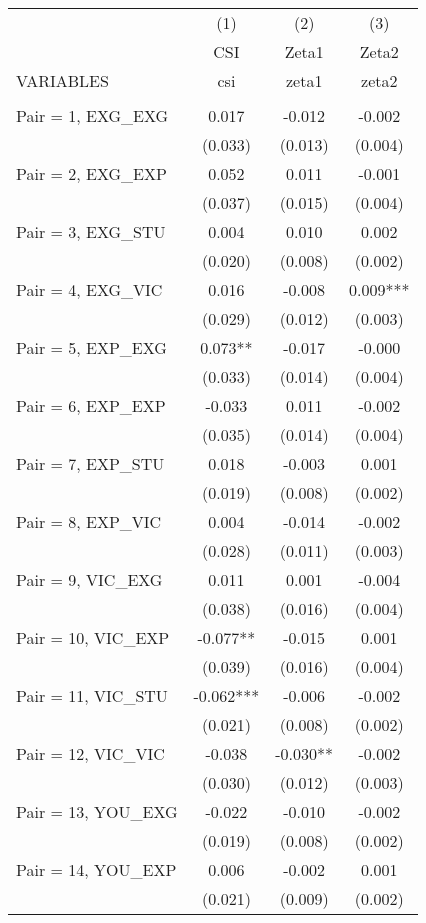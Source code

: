 \documentclass[]{article}
\begin{document}
\begin{tabular}{lccc} \hline
 & (1) & (2) & (3) \\
 & CSI & Zeta1 & Zeta2 \\
VARIABLES & csi & zeta1 & zeta2 \\ \hline
 &  &  &  \\
Pair = 1, EXG\_EXG & 0.017 & -0.012 & -0.002 \\
 & (0.033) & (0.013) & (0.004) \\
Pair = 2, EXG\_EXP & 0.052 & 0.011 & -0.001 \\
 & (0.037) & (0.015) & (0.004) \\
Pair = 3, EXG\_STU & 0.004 & 0.010 & 0.002 \\
 & (0.020) & (0.008) & (0.002) \\
Pair = 4, EXG\_VIC & 0.016 & -0.008 & 0.009*** \\
 & (0.029) & (0.012) & (0.003) \\
Pair = 5, EXP\_EXG & 0.073** & -0.017 & -0.000 \\
 & (0.033) & (0.014) & (0.004) \\
Pair = 6, EXP\_EXP & -0.033 & 0.011 & -0.002 \\
 & (0.035) & (0.014) & (0.004) \\
Pair = 7, EXP\_STU & 0.018 & -0.003 & 0.001 \\
 & (0.019) & (0.008) & (0.002) \\
Pair = 8, EXP\_VIC & 0.004 & -0.014 & -0.002 \\
 & (0.028) & (0.011) & (0.003) \\
Pair = 9, VIC\_EXG & 0.011 & 0.001 & -0.004 \\
 & (0.038) & (0.016) & (0.004) \\
Pair = 10, VIC\_EXP & -0.077** & -0.015 & 0.001 \\
 & (0.039) & (0.016) & (0.004) \\
Pair = 11, VIC\_STU & -0.062*** & -0.006 & -0.002 \\
 & (0.021) & (0.008) & (0.002) \\
Pair = 12, VIC\_VIC & -0.038 & -0.030** & -0.002 \\
 & (0.030) & (0.012) & (0.003) \\
Pair = 13, YOU\_EXG & -0.022 & -0.010 & -0.002 \\
 & (0.019) & (0.008) & (0.002) \\
Pair = 14, YOU\_EXP & 0.006 & -0.002 & 0.001 \\
 & (0.021) & (0.009) & (0.002) \\

\end{tabular}
\end{document}
